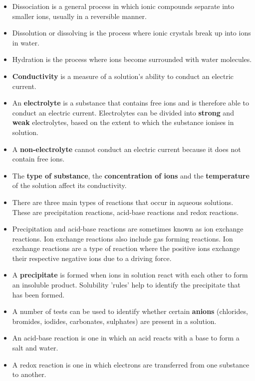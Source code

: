 {{\begin{itemize}[noitemsep]
\item Dissociation is a general process in which ionic compounds separate into smaller ions, usually in a reversible manner.
\item Dissolution or dissolving is the process where ionic crystals break up into ions in water.
\item Hydration is the process where ions become surrounded with water molecules.
\item \textbf{Conductivity} is a measure of a solution's ability to conduct an electric current.
\item An \textbf{electrolyte} is a substance that contains free ions and is therefore able to conduct an electric current. Electrolytes can be divided into \textbf{strong} and \textbf{weak} electrolytes, based on the extent to which the substance ionises in solution.
\item A \textbf{non-electrolyte} cannot conduct an electric current because it does not contain free ions.
\item The \textbf{type of substance}, the \textbf{concentration of ions} and the \textbf{temperature} of the solution affect its conductivity.
\item There are three main types of reactions that occur in aqueous solutions. These are precipitation reactions, acid-base reactions and redox reactions.
\label{m38719*uid8923}\item 
Precipitation and acid-base reactions are sometimes known as ion exchange reactions. Ion exchange reactions also include gas forming reactions. Ion exchange reactions are a type of reaction where the positive ions exchange their respective negative ions due to a driving force.
\label{m38719*uid104}\item A \textbf{precipitate} is formed when ions in solution react with each other to form an insoluble product. Solubility 'rules' help to identify the precipitate that has been formed.
\label{m38719*uid105}\item A number of tests can be used to identify whether certain \textbf{anions} (chlorides, bromides, iodides, carbonates, sulphates) are present in a solution.
\label{m38719*id813}\item An acid-base reaction is one in which an acid reacts with a base to form a salt and water.
\label{m38719*uid823}\item A redox reaction is one in which electrons are transferred from one substance to another. 
\end{itemize}
\label{m38719*eip-896}
}}
